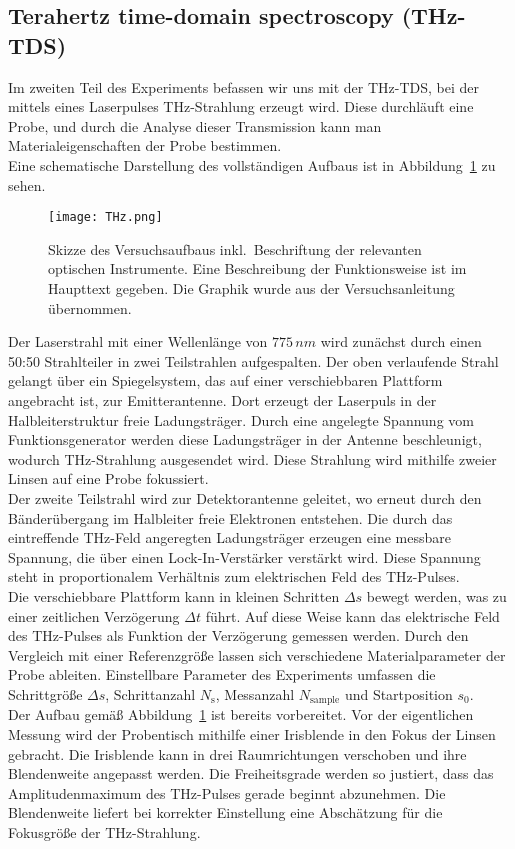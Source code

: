 \subsection{\label{sec:aufbau2}Terahertz time-domain spectroscopy (THz-TDS)}
Im zweiten Teil des Experiments befassen wir uns mit der THz-TDS, bei der mittels eines Laserpulses 
THz-Strahlung erzeugt wird. Diese durchläuft eine Probe, und durch die Analyse dieser Transmission kann man Materialeigenschaften der Probe bestimmen. \\
Eine schematische Darstellung des vollständigen Aufbaus ist in Abbildung~\ref{fig:thztds} zu sehen.
\begin{figure}[h!]
    \centering
    \texttt{[image: THz.png]}
    \caption{\label{fig:thztds}Skizze des Versuchsaufbaus inkl.~Beschriftung der relevanten optischen 
    Instrumente. Eine Beschreibung der Funktionsweise ist im Haupttext gegeben. Die Graphik wurde aus 
    der Versuchsanleitung \cite{Anleitung} übernommen.}
\end{figure}\FloatBarrier
Der Laserstrahl mit einer Wellenlänge von $775\,\si{nm}$ wird zunächst durch einen 50:50 Strahlteiler 
in zwei Teilstrahlen aufgespalten. 
Der oben verlaufende Strahl gelangt über ein Spiegelsystem, das auf einer verschiebbaren Plattform angebracht ist, zur Emitterantenne. 
Dort erzeugt der Laserpuls in der Halbleiterstruktur freie Ladungsträger. Durch eine angelegte Spannung vom Funktionsgenerator werden 
diese Ladungsträger in der Antenne beschleunigt, wodurch THz-Strahlung ausgesendet wird. 
Diese Strahlung wird mithilfe zweier Linsen auf eine Probe fokussiert. \\
Der zweite Teilstrahl wird zur Detektorantenne geleitet, wo erneut durch den Bänderübergang im Halbleiter freie Elektronen entstehen. 
Die durch das eintreffende THz-Feld angeregten Ladungsträger erzeugen eine messbare Spannung, die über einen Lock-In-Verstärker 
verstärkt wird. 
Diese Spannung steht in proportionalem Verhältnis zum elektrischen Feld des THz-Pulses. \\
Die verschiebbare Plattform kann in kleinen Schritten $\Delta s$ bewegt werden, was zu einer zeitlichen Verzögerung 
$\Delta t$ führt. 
Auf diese Weise kann das elektrische Feld des THz-Pulses als Funktion der Verzögerung gemessen werden. 
Durch den Vergleich mit einer Referenzgröße lassen sich verschiedene Materialparameter der Probe ableiten. 
Einstellbare Parameter des Experiments umfassen die Schrittgröße $\Delta s$, Schrittanzahl $N_{\text{s}}$, Messanzahl $N_{\text{sample}}$ und Startposition $s_{0}$. \\
Der Aufbau gemäß Abbildung~\ref{fig:thztds} ist bereits vorbereitet. 
Vor der eigentlichen Messung wird der Probentisch mithilfe einer Irisblende in den Fokus der Linsen gebracht. 
Die Irisblende kann in drei Raumrichtungen verschoben und ihre Blendenweite angepasst werden. 
Die Freiheitsgrade werden so justiert, dass das Amplitudenmaximum des THz-Pulses gerade beginnt abzunehmen. 
Die Blendenweite liefert bei korrekter Einstellung eine Abschätzung für die Fokusgröße der THz-Strahlung.